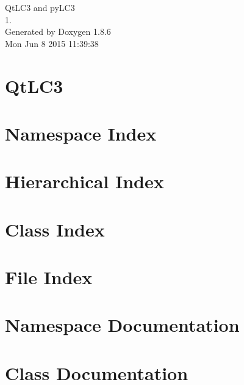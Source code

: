 \documentclass[twoside]{book}
\newcommand{\clearemptydoublepage}{%
  \newpage{\pagestyle{empty}\cleardoublepage}%
}
\begin{document}
\hypersetup{pageanchor=false}
\begin{titlepage}
\vspace*{7cm}
\begin{center}%
{\Large Qt\-L\-C3 and py\-L\-C3 \\[1ex]\large 1. }\\
\vspace*{1cm}
{\large Generated by Doxygen 1.8.6}\\
\vspace*{0.5cm}
{\small Mon Jun 8 2015 11:39:38}\\
\end{center}
\end{titlepage}
\clearemptydoublepage
\tableofcontents
\clearemptydoublepage
{}
\hypersetup{pageanchor=true}

\chapter{Qt\-L\-C3}
\label{md__r_e_a_d_m_e}
\hypertarget{md__r_e_a_d_m_e}{}

\chapter{Namespace Index}

\chapter{Hierarchical Index}

\chapter{Class Index}

\chapter{File Index}

\chapter{Namespace Documentation}







\chapter{Class Documentation}









\end{document}
